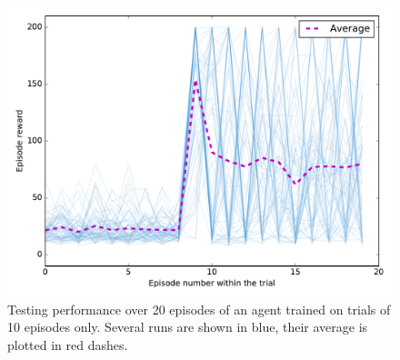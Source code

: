 \begin{figure}
	\centering
	\includegraphics[width=0.8\linewidth]{fig/horizon_10_20.pdf}
	\caption{Testing performance over 20 episodes of an agent trained on 
	trials of 10 episodes only. 
	Several runs are shown in blue, their average is plotted in red dashes.}
	\label{fig:horizon_10_20}
\end{figure}
